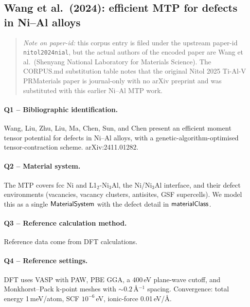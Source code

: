 \subsection{Wang et al.\ (2024): efficient MTP for defects in Ni--Al alloys}
\label{sec:appendix-example-nitol2024nial}

\begin{quote}
\emph{Note on paper-id:} this corpus entry is filed under the
upstream paper-id \texttt{nitol2024nial}, but the actual authors of
the encoded paper are Wang et al.\ (Shenyang National Laboratory for
Materials Science). The CORPUS.md substitution table notes that the
original Nitol 2025 Ti-Al-V PRMaterials paper is journal-only with
no arXiv preprint and was substituted with this earlier Ni--Al MTP
work.
\end{quote}

\paragraph{Q1 -- Bibliographic identification.}
Wang, Liu, Zhu, Liu, Ma, Chen, Sun, and Chen present an efficient
moment tensor potential for defects in Ni--Al alloys, with a
genetic-algorithm-optimised tensor-contraction scheme.
arXiv:2411.01282.


\paragraph{Q2 -- Material system.}
The MTP covers fcc Ni and L1$_2$-Ni$_3$Al, the Ni/Ni$_3$Al interface,
and their defect environments (vacancies, vacancy clusters, antisites,
GSF supercells). We model this as a single $\mathsf{MaterialSystem}$ with
the defect detail in $\mathsf{materialClass}$.


\paragraph{Q3 -- Reference calculation method.}
Reference data come from DFT calculations.


\paragraph{Q4 -- Reference settings.}
DFT uses VASP with PAW, PBE GGA, a 400\,eV plane-wave cutoff, and
Monkhorst--Pack k-point meshes with ${\sim}0.2$\,\AA$^{-1}$ spacing.
Convergence: total energy 1\,meV/atom, SCF $10^{-6}$\,eV, ionic-force
0.01\,eV/\AA.


